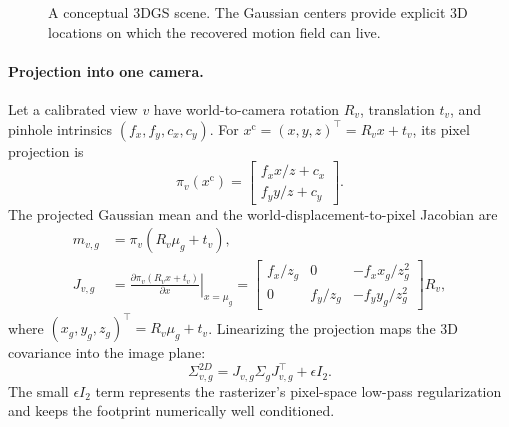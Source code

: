\documentclass[10pt]{article}
\begin{document}
\begin{figure}[htbp]
  \centering
  \caption{A conceptual 3DGS scene. The Gaussian centers provide explicit 3D
  locations on which the recovered motion field can live.}
\end{figure}

\paragraph{Projection into one camera.}
Let a calibrated view $v$ have world-to-camera rotation $R_v$, translation
$t_v$, and pinhole intrinsics $(f_x,f_y,c_x,c_y)$. For
$x^{\mathrm c}=(x,y,z)^\top=R_vx+t_v$, its pixel projection is
\begin{equation}
  \pi_v(x^{\mathrm c})
  =
  \begin{bmatrix}
    f_x x/z+c_x\\
    f_y y/z+c_y
  \end{bmatrix}.
\end{equation}
The projected Gaussian mean and the world-displacement-to-pixel Jacobian are
\begin{align}
  m_{v,g} &= \pi_v(R_v\mu_g+t_v),\\
  J_{v,g}
  &=
  \left.
  \frac{\partial\pi_v(R_vx+t_v)}{\partial x}
  \right|_{x=\mu_g}
  =
  \begin{bmatrix}
    f_x/z_g & 0 & -f_x x_g/z_g^2\\
    0 & f_y/z_g & -f_y y_g/z_g^2
  \end{bmatrix}R_v,
\end{align}
where $(x_g,y_g,z_g)^\top=R_v\mu_g+t_v$. Linearizing the projection maps the
3D covariance into the image plane:
\begin{equation}
  \Sigma^{2D}_{v,g}
  =J_{v,g}\Sigma_gJ_{v,g}^\top+\epsilon I_2.
\end{equation}
The small $\epsilon I_2$ term represents the rasterizer's pixel-space
low-pass regularization and keeps the footprint numerically well conditioned.
\end{document}
